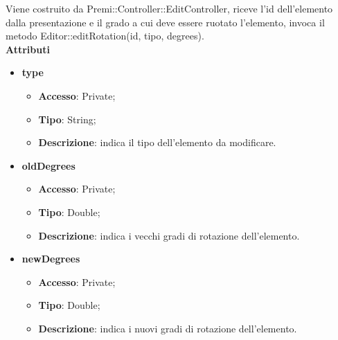{{{		\indent Viene costruito da Premi::Controller::EditController, riceve l’id dell’elemento dalla presentazione e il grado a cui deve essere ruotato l’elemento, invoca il metodo Editor::editRotation(id, tipo, degrees).\\
	\textbf{Attributi}
	\begin{itemize}
		\item \textbf{type}
		\begin{itemize}
			\item \textbf{Accesso}: Private;
			\item \textbf{Tipo}: String;
			\item \textbf{Descrizione}: indica il tipo dell’elemento da modificare.
		\end{itemize}
		\item \textbf{oldDegrees}
		\begin{itemize}
			\item \textbf{Accesso}: Private;
			\item \textbf{Tipo}: Double;
			\item \textbf{Descrizione}: indica i vecchi gradi di rotazione dell’elemento.
		\end{itemize}
		\item \textbf{newDegrees}
		\begin{itemize}
			\item \textbf{Accesso}: Private;
			\item \textbf{Tipo}: Double;
			\item \textbf{Descrizione}: indica i nuovi gradi di rotazione dell’elemento.
		\end{itemize}
	\end{itemize}
	
}}}

